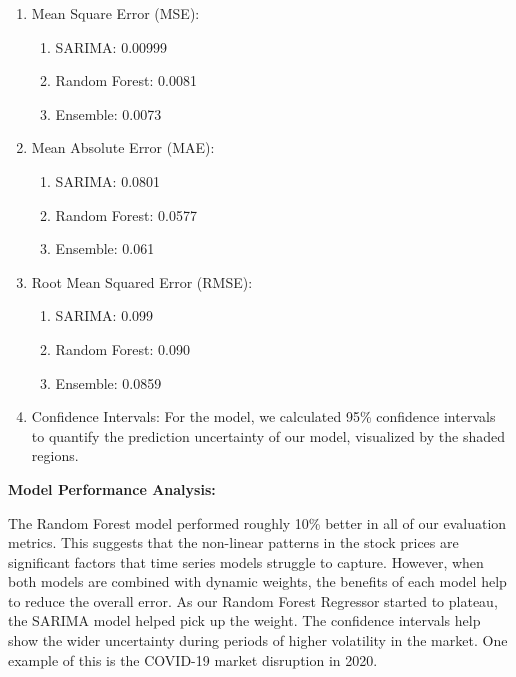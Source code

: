 \documentclass[conference]{IEEEtran}
\begin{document}
\begin{enumerate}

    \item Mean Square Error (MSE):

    \begin{enumerate}
        \item SARIMA: 0.00999
        \item Random Forest: 0.0081
        \item Ensemble: 0.0073
    \end{enumerate}

    \item Mean Absolute Error (MAE):
    
    \begin{enumerate}
        \item SARIMA: 0.0801
        \item Random Forest: 0.0577
        \item Ensemble: 0.061
    \end{enumerate}

    \item Root Mean Squared Error (RMSE):

    \begin{enumerate}
        \item SARIMA: 0.099
        \item Random Forest: 0.090
        \item Ensemble: 0.0859
    \end{enumerate}    

    \item Confidence Intervals: For the model, we calculated 95\% confidence intervals to quantify the prediction uncertainty of our model, visualized by the shaded regions. 

    
\end{enumerate}

\textbf{Model Performance Analysis:}

The Random Forest model performed roughly 10\% better in all of our evaluation metrics. This suggests that the non-linear patterns in the stock prices are significant factors that time series models struggle to capture.
However, when both models are combined with dynamic weights, the benefits of each model help to reduce the overall error. As our Random Forest Regressor started to plateau, the SARIMA model helped pick up the weight. 
The confidence intervals help show the wider uncertainty during periods of higher volatility in the market. One example of this is the COVID-19 market disruption in 2020.
\end{document}
